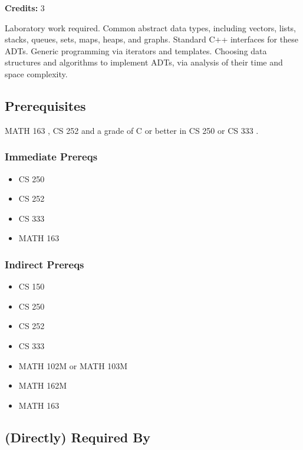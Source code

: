 \documentclass[]{article}
\providecommand{\tightlist}{%
  \setlength{\itemsep}{0pt}\setlength{\parskip}{0pt}}
\begin{document}
\textbf{Credits:} 3

Laboratory work required. Common abstract data types, including vectors,
lists, stacks, queues, sets, maps, heaps, and graphs. Standard C++
interfaces for these ADTs. Generic programming via iterators and
templates. Choosing data structures and algorithms to implement ADTs,
via analysis of their time and space complexity.

\subsection{Prerequisites}\label{prerequisites-19}

MATH 163 , CS 252 and a grade of C or better in CS 250 or CS 333 .

\subsubsection{Immediate Prereqs}\label{immediate-prereqs-14}

\begin{itemize}
\tightlist
\item
  CS 250
\item
  CS 252
\item
  CS 333
\item
  MATH 163
\end{itemize}

\subsubsection{Indirect Prereqs}\label{indirect-prereqs-14}

\begin{itemize}
\tightlist
\item
  CS 150
\item
  CS 250
\item
  CS 252
\item
  CS 333
\item
  MATH 102M or MATH 103M
\item
  MATH 162M
\item
  MATH 163
\end{itemize}

\subsection{(Directly) Required By}\label{directly-required-by-10}
\end{document}
